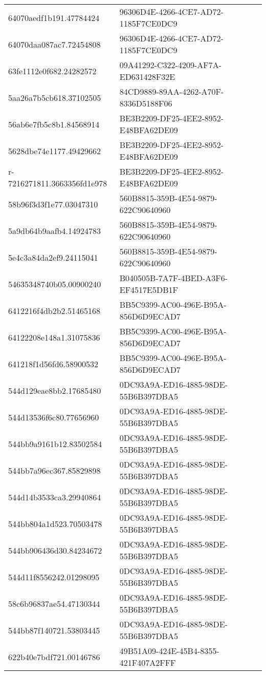 \begin{tabular}{ll}
64070aedf1b191.47784424 & 96306D4E-4266-4CE7-AD72-1185F7CE0DC9 \\
64070daa087ac7.72454808 & 96306D4E-4266-4CE7-AD72-1185F7CE0DC9 \\
63fe1112e0f682.24282572 & 09A41292-C322-4209-AF7A-ED631428F32E \\
5aa26a7b5cb618.37102505 & 84CD9889-89AA-4262-A70F-8336D5188F06 \\
56ab6e7fb5c8b1.84568914 & BE3B2209-DF25-4EE2-8952-E48BFA62DE09 \\
5628dbe74e1177.49429662 & BE3B2209-DF25-4EE2-8952-E48BFA62DE09 \\
r-7216271811.3663356fd1e978 & BE3B2209-DF25-4EE2-8952-E48BFA62DE09 \\
58b96f3d3f1e77.03047310 & 560B8815-359B-4E54-9879-622C90640960 \\
5a9db64b9aafb4.14924783 & 560B8815-359B-4E54-9879-622C90640960 \\
5e4c3a84da2ef9.24115041 & 560B8815-359B-4E54-9879-622C90640960 \\
54635348740b05.00900240 & B040505B-7A7F-4BED-A3F6-EF4517E5DB1F \\
6412216f4db2b2.51465168 & BB5C9399-AC00-496E-B95A-856D6D9ECAD7 \\
64122208e148a1.31075836 & BB5C9399-AC00-496E-B95A-856D6D9ECAD7 \\
641218f1d56fd6.58900532 & BB5C9399-AC00-496E-B95A-856D6D9ECAD7 \\
544d129eae8bb2.17685480 & 0DC93A9A-ED16-4885-98DE-55B6B397DBA5 \\
544d13536f6c80.77656960 & 0DC93A9A-ED16-4885-98DE-55B6B397DBA5 \\
544bb9a9161b12.83502584 & 0DC93A9A-ED16-4885-98DE-55B6B397DBA5 \\
544bb7a96ec367.85829898 & 0DC93A9A-ED16-4885-98DE-55B6B397DBA5 \\
544d14b3533ca3.29940864 & 0DC93A9A-ED16-4885-98DE-55B6B397DBA5 \\
544bb804a1d523.70503478 & 0DC93A9A-ED16-4885-98DE-55B6B397DBA5 \\
544bb906436d30.84234672 & 0DC93A9A-ED16-4885-98DE-55B6B397DBA5 \\
544d11f8556242.01298095 & 0DC93A9A-ED16-4885-98DE-55B6B397DBA5 \\
58c6b96837ae54.47130344 & 0DC93A9A-ED16-4885-98DE-55B6B397DBA5 \\
544bb87f140721.53803445 & 0DC93A9A-ED16-4885-98DE-55B6B397DBA5 \\
622b40e7bdf721.00146786 & 49B51A09-424E-45B4-8355-421F407A2FFF \\

\end{tabular}
